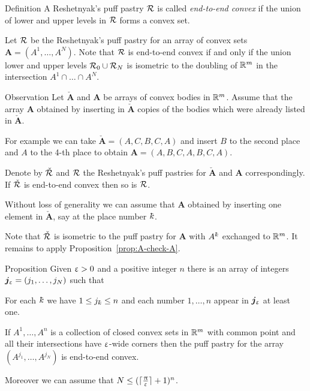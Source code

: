 \begin{thm}{Definition}
A Reshetnyak's puff pastry $\mathcal{R}$ 
is called \emph{end-to-end convex} 
if the union of lower and upper levels in $\mathcal{R}$ 
forms a convex set.
\end{thm}

Let $\mathcal{R}$ be the Reshetnyak's puff pastry for an array of convex sets $\bm{A}=(A^{1},\dots, A^{N})$.
Note that $\mathcal{R}$ is end-to-end convex
if and only if the union lower and upper levels
$\spc{R}_0\cup\spc{R}_N$ is isometric to the doubling of $\mathbb{R}^m$ in the intersection $A^1\cap\dots\cap A^N$.


\begin{thm}{Observation}\label{obs:end-to-end-convex}
Let $\check{\bm{A}}$ and $\bm{A}$ be arrays of convex bodies in $\mathbb{R}^m$.
Assume that 
the  array $\bm{A}$ 
obtained by inserting in $\check{\bm{A}}$
copies of the bodies which were already listed in $\check{\bm{A}}$.

For example we can take $\check{\bm{A}}=(A,C,B,C,A)$ 
and insert $B$ to the second place and $A$ to the 4-th place to obtain $\bm{A}=(A,B,C,A,B,C,A)$.

Denote by $\check{\mathcal{R}}$ and $\mathcal{R}$ 
the Reshetnyak's puff pastries for $\check{\bm{A}}$ and $\bm{A}$ correspondingly.
If $\check{\mathcal{R}}$ is end-to-end convex then so is $\mathcal{R}$.
\end{thm}

Without loss of generality we can assume that $\bm{A}$ 
obtained by inserting one element in $\check{\bm{A}}$,
say at the place number $\kay$.

Note that $\check{\mathcal{R}}$ is isometric to the puff pastry 
for $\bm{A}$ with $A^\kay$ exchanged to $\mathbb{R}^m$.
It remains to apply Proposition~\ref{prop:A-check-A}.
\qeds


\begin{thm}{Proposition}\label{prop:end-to-end-convex}
Given $\upvarepsilon>0$ and a positive integer $n$
there is an array of integers $\bm{j}_\eps=(j_1,\dots,j_N)$ 
such that 

\begin{subthm}{} For each $\kay$ we have $1\le j_\kay\le n$
and each number $1,\dots,n$ appear in $\bm{j}_\upvarepsilon$ at least one.
\end{subthm}

\begin{subthm}{}
If $A^1,\dots,A^n$ is a collection of closed convex sets in $\mathbb{R}^m$ with common point 
and all their intersections have $\upvarepsilon$-wide corners 
then the puff pastry for the array
$(A^{j_1},\dots,A^{j_N})$ is end-to-end convex.
\end{subthm}

Moreover we can assume that $N\le (\lceil\tfrac\pi\eps\rceil+1)^n$.
\end{thm}

